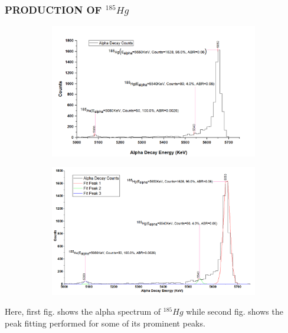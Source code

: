 \documentclass[12pt]{article}
\begin{document}
\subsubsection{PRODUCTION OF $^{185}Hg$}
\begin{figure}[h]
\centering
\begin{subfigure}
\centering
\includegraphics[scale=0.52]{Hg185.png}
\end{subfigure}
\hfill
\begin{subfigure}
\centering
\includegraphics[scale=0.48]{Hg185(Peak Fitting).png}
\end{subfigure}
\label{First fig shows the alpha spectrum of Hg 185 and second fig shows the peak fitting for its prominent peaks.}
\end{figure}
Here, first fig. shows the alpha spectrum of $^{185}Hg$ while second fig. shows the peak fitting performed for some of its prominent peaks.
\clearpage
\end{document}
